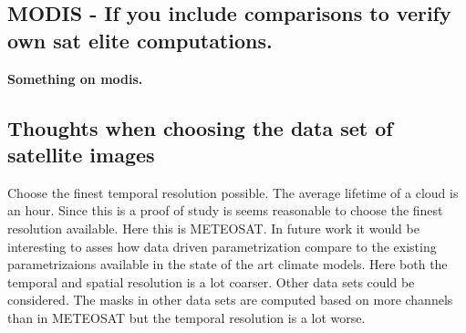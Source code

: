 \subsection{MODIS - If you include comparisons to verify own sat elite computations.} \label{sec:modis}
\textbf{Something on modis.}



\subsection{Thoughts when choosing the data set of satellite images}
Choose the finest temporal resolution possible. The average lifetime of a cloud is an hour. Since this is a proof of study is seems reasonable to choose the finest resolution available. Here this is METEOSAT.
In future work it would be interesting to asses how data driven parametrization compare to the existing parametrizaions available in the state of the art climate models. Here both the temporal and spatial resolution is a lot coarser. Other data sets could be considered. The masks in other data sets are computed based on more channels than in METEOSAT but the temporal resolution is a lot worse. 

